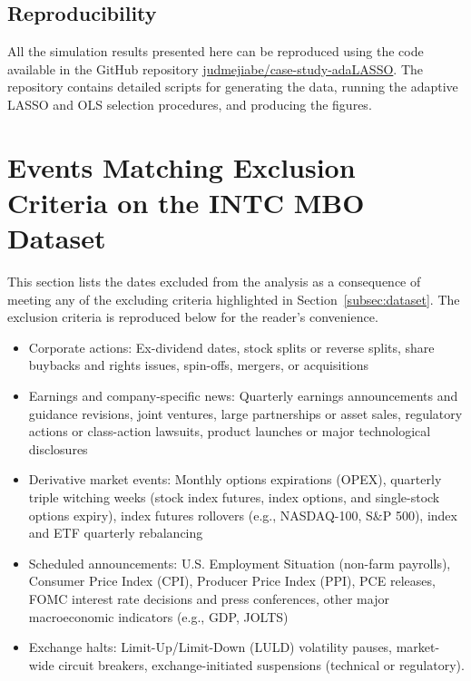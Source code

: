 \documentclass[10pt,a4paper,oneside]{article}
\begin{document}
\subsection{Reproducibility}
\label{subsec:reproducibility}

All the simulation results presented here can be reproduced using the code available in the GitHub repository \url{judmejiabe/case-study-adaLASSO}. The repository contains detailed scripts for generating the data, running the adaptive LASSO and OLS selection procedures, and producing the figures.

\clearpage
\section{Events Matching Exclusion Criteria on the INTC MBO Dataset}
\label{sec:exclusion_criteria}

This section lists the dates excluded from the analysis as a consequence of meeting any of the excluding criteria highlighted in Section~\ref{subsec:dataset}. The exclusion criteria is reproduced below for the reader's convenience.

\begin{itemize}
    \item Corporate actions: Ex-dividend dates, stock splits or reverse splits, share buybacks and rights issues, spin-offs, mergers, or acquisitions
    \item Earnings and company-specific news: Quarterly earnings announcements and guidance revisions, joint ventures, large partnerships or asset sales, regulatory actions or class-action lawsuits, product launches or major technological disclosures
    \item Derivative market events: Monthly options expirations (OPEX), quarterly triple witching weeks (stock index futures, index options, and single-stock options expiry), index futures rollovers (e.g., NASDAQ-100, S\&P 500), index and ETF quarterly rebalancing
    \item Scheduled announcements: U.S. Employment Situation (non-farm payrolls), Consumer Price Index (CPI), Producer Price Index (PPI), PCE releases, FOMC interest rate decisions and press conferences, other major macroeconomic indicators (e.g., GDP, JOLTS)
    \item Exchange halts: Limit-Up/Limit-Down (LULD) volatility pauses, market-wide circuit breakers, exchange-initiated suspensions (technical or regulatory).
\end{itemize}
\end{document}
